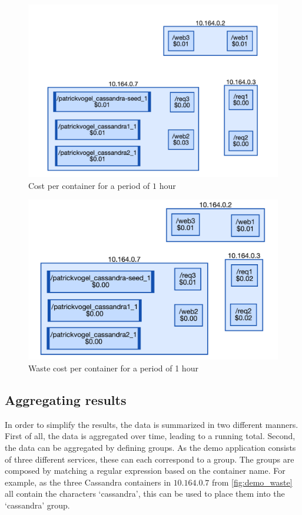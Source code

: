 \begin{figure}[H]
    \centering
    \includegraphics[width=\textwidth]{gfx/demo_cost}
    \caption{Cost per container for a period of $1$ hour}
    \label{fig:demo_cost}
\end{figure}

\begin{figure}[H]
    \centering
    \includegraphics[width=\textwidth]{gfx/demo_waste}
    \caption{Waste cost per container for a period of 1 hour}
    \label{fig:demo_waste}
\end{figure}

\subsection{Aggregating results} \label{sec:aggregating_results}
In order to simplify the results, the data is summarized in two different manners. First of all, the data is aggregated over time, leading to a running total. Second, the data can be aggregated by defining groups. As the demo application consists of three different services, these can each correspond to a group. The groups are composed by matching a regular expression based on the container name. For example, as the three Cassandra containers in $10.164.0.7$ from \autoref{fig:demo_waste} all contain the characters `cassandra', this can be used to place them into the `cassandra' group.\\

